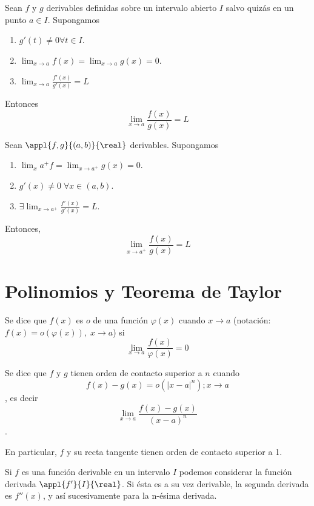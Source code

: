 \documentclass[palatino, nochap]{apuntes}
\begin{document}
\begin{theorem}
Sean $f$ y $g$ derivables definidas sobre un intervalo abierto $I$ salvo quizás en un punto $a\in I$. Supongamos \begin{enumerate}
\item $g'(t)\neq 0 \forall t \in I$.
\item $\lim_{x\to a}f(x)=\lim_{x\to a}g(x)=0$.
\item $\lim_{x\to a}\frac{f'(x)}{g'(x)}=L$
\end{enumerate}

Entonces \[ \lim_{x\to a}\frac{f(x)}{g(x)}=L \]
\end{theorem}

\begin{lemma}
Sean $\appl{f,g}{(a,b)}{\real}$ derivables. Supongamos \begin{enumerate}
\item $\lim_{x}{a^+}{f}=\lim_{x\to a^+}g(x)=0$.
\item $g'(x)\neq 0 \; \forall x \in (a,b)$.
\item $\exists\lim_{x\to a^+}\frac{f'(x)}{g'(x)}=L$.
\end{enumerate}

Entonces, \[ \lim_{x\to a^+}\frac{f(x)}{g(x)}=L \]
\end{lemma}

\section{Polinomios y Teorema de Taylor}
\begin{defn}Se dice que $f(x)$ es $o$ de una función $\varphi(x)$ cuando $x\to a$ (notación: $f(x)=o(\varphi(x)),\; x\to a$) si \[ \lim_{x\to a} \frac{f(x)}{\varphi(x)}=0\]
\end{defn}

\begin{defn}Se dice que $f$ y $g$ tienen orden de contacto superior a $n$ cuando \[f(x)-g(x)=o(|x-a|^n); x\to a\], es decir \[ \lim_{x\to a}\frac{f(x)-g(x)}{(x-a)^n}\].
\end{defn}

En particular, $f$ y su recta tangente tienen orden de contacto superior a 1.

\begin{defn}
Si $f$ es una función derivable en un intervalo $I$ podemos considerar la función derivada $\appl{f'}{I}{\real}$. Si ésta es a su vez derivable, la segunda derivada es $f''(x)$, y así sucesivamente para la n-ésima derivada. \end{defn}
\end{document}
